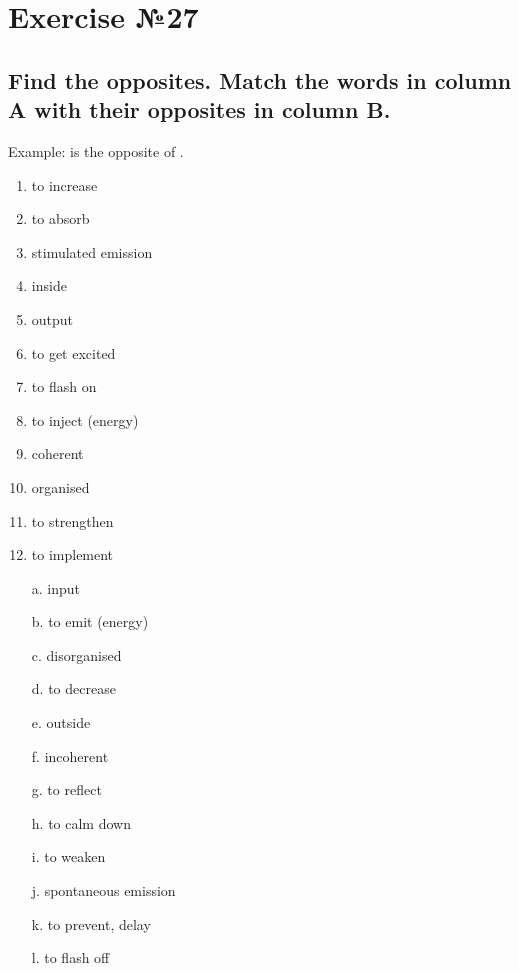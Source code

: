 \section*{Exercise №27}
\subsection*{Find the opposites. Match the words in column A with their opposites in
      column B.}
Example:  is the opposite of .

\begin{enumerate}
      \item to increase
      \item to absorb
      \item stimulated emission
      \item inside
      \item output
      \item to get excited
      \item to flash on
      \item to inject (energy)
      \item coherent
      \item organised
      \item to strengthen
      \item to implement \\
\end{enumerate}

\begin{enumerate}
      \item[a.] input
      \item[b.] to emit (energy)
      \item[c.] disorganised
      \item[d.] to decrease
      \item[e.] outside
      \item[f.] incoherent
      \item[g.] to reflect
      \item[h.] to calm down
      \item[i.] to weaken
      \item[j.] spontaneous emission
      \item[k.] to prevent, delay
      \item[l.] to flash off
\end{enumerate}

